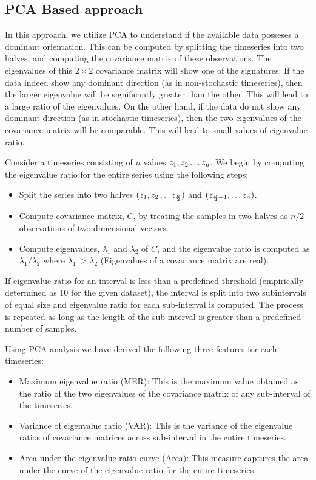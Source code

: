 \documentclass[10pt,conference]{IEEEtran}
\begin{document}
\subsection{PCA Based approach}
In this approach, we utilize PCA to understand if the available data posseses a dominant orientation. This can be computed by splitting the timeseries into two halves, and computing the covariance matrix of these observations. The eigenvalues of this $2 \times 2$ covariance matrix will show one of the signatures: If the data indeed show any dominant direction (as in non-stochastic timeseries), then the larger eigenvalue will be significantly greater than the other. This will lead to a large ratio of the eigenvalues. On the other hand, if the data do not show any dominant direction (as in stochastic timeseries), then the two eigenvalues of the covariance matrix will be comparable. This will lead to small values of eigenvalue ratio.

Consider a timeseries consisting of $n$ values  $z_1, z_2 \mathellipsis z_n$. We begin by computing the eigenvalue ratio for the entire series using the following steps:
\begin{itemize}
  \item  Split the series into two halves $(z_1, z_2 \mathellipsis z_{\frac{n}{2}})$ and $(z_{\frac{n}{2} + 1}, \mathellipsis z_n)$.
  \item Compute covariance matrix, $C$,  by treating the samples in two halves as $n/2$ observations of two dimensional vectors.
  \item Compute eigenvalues, $\lambda_1$ and $\lambda_2$ of $C$,  and the eigenvalue ratio is computed as  $\lambda_1/\lambda_2$ where $\lambda_1 \ > \lambda_2$ (Eigenvalues of a covariance matrix are real).
\end{itemize}
If eigenvalue ratio for an interval is less than a predefined threshold (empirically determined as 10 for the given dataset), the interval is split into two subintervals of equal size and eigenvalue ratio for each sub-interval is computed. The process is repeated as long as the length of the sub-interval is greater than a predefined number of samples.

Using PCA analysis we have derived the following three features for each timeseries:
\begin{itemize}
  \item Maximum eigenvalue ratio (MER): This is the maximum value obtained as the ratio of the two eigenvalues of the covariance matrix of any sub-interval of the timeseries.
  \item Variance of eigenvalue ratio (VAR): This is the variance of the eigenvalue ratios of covariance matrices across sub-interval in the entire timeseries.
  \item Area under the eigenvalue ratio curve (Area): This measure captures the area under the curve of the eigenvalue ratio for the entire timeseries.
\end{itemize}
\end{document}

